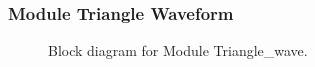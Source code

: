 \subsubsection{Module Triangle Waveform}
\begin{figure}[H]
	\centering
	\caption{Block diagram for Module Triangle\_wave.}
\end{figure}